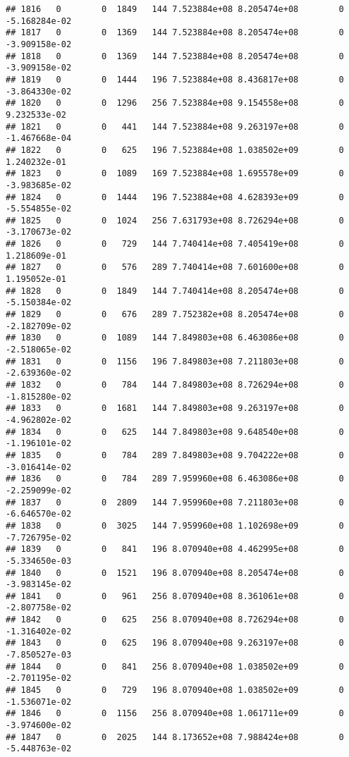 \documentclass[
]{article}
\begin{document}
\begin{enumerate}
\begin{verbatim}
## 1816   0        0  1849   144 7.523884e+08 8.205474e+08        0 -5.168284e-02
## 1817   0        0  1369   144 7.523884e+08 8.205474e+08        0 -3.909158e-02
## 1818   0        0  1369   144 7.523884e+08 8.205474e+08        0 -3.909158e-02
## 1819   0        0  1444   196 7.523884e+08 8.436817e+08        0 -3.864330e-02
## 1820   0        0  1296   256 7.523884e+08 9.154558e+08        0  9.232533e-02
## 1821   0        0   441   144 7.523884e+08 9.263197e+08        0 -1.467668e-04
## 1822   0        0   625   196 7.523884e+08 1.038502e+09        0  1.240232e-01
## 1823   0        0  1089   169 7.523884e+08 1.695578e+09        0 -3.983685e-02
## 1824   0        0  1444   196 7.523884e+08 4.628393e+09        0 -5.554855e-02
## 1825   0        0  1024   256 7.631793e+08 8.726294e+08        0 -3.170673e-02
## 1826   0        0   729   144 7.740414e+08 7.405419e+08        0  1.218609e-01
## 1827   0        0   576   289 7.740414e+08 7.601600e+08        0  1.195052e-01
## 1828   0        0  1849   144 7.740414e+08 8.205474e+08        0 -5.150384e-02
## 1829   0        0   676   289 7.752382e+08 8.205474e+08        0 -2.182709e-02
## 1830   0        0  1089   144 7.849803e+08 6.463086e+08        0 -2.518065e-02
## 1831   0        0  1156   196 7.849803e+08 7.211803e+08        0 -2.639360e-02
## 1832   0        0   784   144 7.849803e+08 8.726294e+08        0 -1.815280e-02
## 1833   0        0  1681   144 7.849803e+08 9.263197e+08        0 -4.962802e-02
## 1834   0        0   625   144 7.849803e+08 9.648540e+08        0 -1.196101e-02
## 1835   0        0   784   289 7.849803e+08 9.704222e+08        0 -3.016414e-02
## 1836   0        0   784   289 7.959960e+08 6.463086e+08        0 -2.259099e-02
## 1837   0        0  2809   144 7.959960e+08 7.211803e+08        0 -6.646570e-02
## 1838   0        0  3025   144 7.959960e+08 1.102698e+09        0 -7.726795e-02
## 1839   0        0   841   196 8.070940e+08 4.462995e+08        0 -5.334650e-03
## 1840   0        0  1521   196 8.070940e+08 8.205474e+08        0 -3.983145e-02
## 1841   0        0   961   256 8.070940e+08 8.361061e+08        0 -2.807758e-02
## 1842   0        0   625   256 8.070940e+08 8.726294e+08        0 -1.316402e-02
## 1843   0        0   625   196 8.070940e+08 9.263197e+08        0 -7.850527e-03
## 1844   0        0   841   256 8.070940e+08 1.038502e+09        0 -2.701195e-02
## 1845   0        0   729   196 8.070940e+08 1.038502e+09        0 -1.536071e-02
## 1846   0        0  1156   256 8.070940e+08 1.061711e+09        0 -3.974600e-02
## 1847   0        0  2025   144 8.173652e+08 7.988424e+08        0 -5.448763e-02

\end{verbatim}
\end{enumerate}
\end{document}
